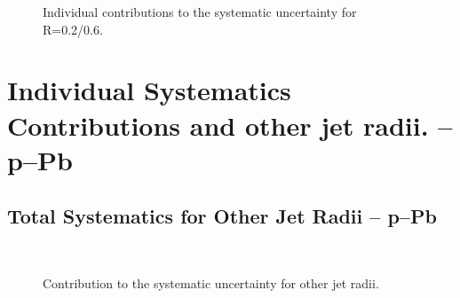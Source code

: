 \documentclass[ALICE]{ALICE_analysis_notes}
\begin{document}
\begin{appendix}
\begin{figure}[h!]
    \qquad
    \caption{Individual contributions to the systematic uncertainty for R=0.2/0.6.}
    \label{fig:IndividualSysRatiosR06}
\end{figure}

\newpage

\section{Individual Systematics Contributions and other jet radii. -- p--Pb}
\label{sec:AppendixSystematicspPb}

\subsection{Total Systematics for Other Jet Radii -- p--Pb}
\label{subsec:appendixTotalSystematicspPb}

\begin{figure}[h!]
    \centering
    \qquad
    \\
    \caption{Contribution to the systematic uncertainty for other jet radii.}
    \label{fig:TotalSysOtherRpPb}
\end{figure}


\end{appendix}
\end{document}

